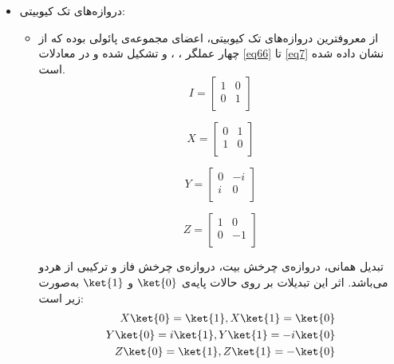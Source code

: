 \begin{itemize}
\item
دروازه‌های تک کیوبیتی:

\begin{itemize}
\item

از معروفترین دروازه‌های تک کیوبیتی، اعضای مجموعه‌ی پائولی بوده که از چهار عملگر ، ،  و  تشکیل شده و در معادلات \eqref{eq66} تا \eqref{eq7} نشان داده شده است. 
\begin{equation}
I=
\begin{bmatrix}
1&0\\
0&1\\
\end{bmatrix}
\label{eq66}
\end{equation}
 
 \begin{equation}
X=
\begin{bmatrix}
0&1\\
1&0\\
\end{bmatrix}
\label{eq5}
\end{equation}


\begin{equation}
Y=
\begin{bmatrix}
0&-i\\
i&0\\
\end{bmatrix}
\label{eq6}
\end{equation}

\begin{equation}
Z=
\begin{bmatrix}
1&0\\
0&-1\\
\end{bmatrix}
\label{eq7}
\end{equation}

تبدیل همانی،  دروازه‌ی چرخش بیت،  دروازه‌ی چرخش فاز و  ترکیبی از هردو می‌باشد. اثر این تبدیلات بر روی حالات پایه‌ی $\ket{0}$ و $\ket{1}$ به‌صورت زیر است:
\begin{equation}
\begin{split}
X\ket{0}=\ket{1},X\ket{1}=\ket{0}\\
Y\ket{0}=i\ket{1},Y\ket{1}=-i\ket{0}\\
Z\ket{0}=\ket{1},Z\ket{1}=-\ket{0}
\end{split}
\label{eq99}
\end{equation}




\end{itemize}
\end{itemize}
